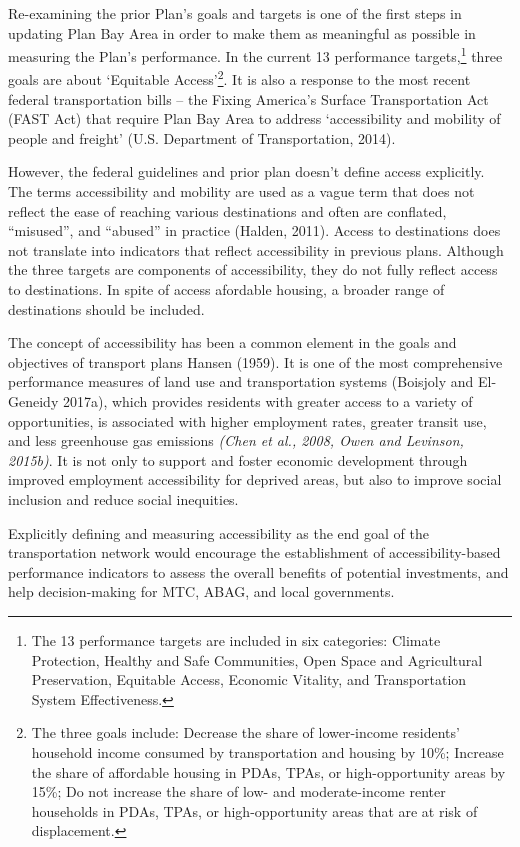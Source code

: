 \documentclass[12pt,]{article}
\let\rmarkdownfootnote\footnote%
\def\footnote{\protect\rmarkdownfootnote}
\begin{document}
Re-examining the prior Plan's goals and targets is one of the first
steps in updating Plan Bay Area in order to make them as meaningful as
possible in measuring the Plan's performance. In the current 13
performance targets,\footnote{The 13 performance targets are included in
  six categories: Climate Protection, Healthy and Safe Communities, Open
  Space and Agricultural Preservation, Equitable Access, Economic
  Vitality, and Transportation System Effectiveness.} three goals are
about `Equitable Access'\footnote{The three goals include: Decrease the
  share of lower-income residents' household income consumed by
  transportation and housing by 10\%; Increase the share of affordable
  housing in PDAs, TPAs, or high-opportunity areas by 15\%; Do not
  increase the share of low- and moderate-income renter households in
  PDAs, TPAs, or high-opportunity areas that are at risk of
  displacement.}. It is also a response to the most recent federal
transportation bills -- the Fixing America's Surface Transportation Act
(FAST Act) that require Plan Bay Area to address `accessibility and
mobility of people and freight' (U.S. Department of Transportation,
2014).

However, the federal guidelines and prior plan doesn't define access
explicitly. The terms accessibility and mobility are used as a vague
term that does not reflect the ease of reaching various destinations and
often are conflated, ``misused'', and ``abused'' in practice (Halden,
2011). Access to destinations does not translate into indicators that
reflect accessibility in previous plans. Although the three targets are
components of accessibility, they do not fully reflect access to
destinations. In spite of access afordable housing, a broader range of
destinations should be included.

The concept of accessibility has been a common element in the goals and
objectives of transport plans Hansen (1959). It is one of the most
comprehensive performance measures of land use and transportation
systems (Boisjoly and El-Geneidy 2017a), which provides residents with
greater access to a variety of opportunities, is associated with higher
employment rates, greater transit use, and less greenhouse gas emissions
\emph{(Chen et al., 2008, Owen and Levinson, 2015b)}. It is not only to
support and foster economic development through improved employment
accessibility for deprived areas, but also to improve social inclusion
and reduce social inequities.

Explicitly defining and measuring accessibility as the end goal of the
transportation network would encourage the establishment of
accessibility-based performance indicators to assess the overall
benefits of potential investments, and help decision-making for MTC,
ABAG, and local governments.
\end{document}

